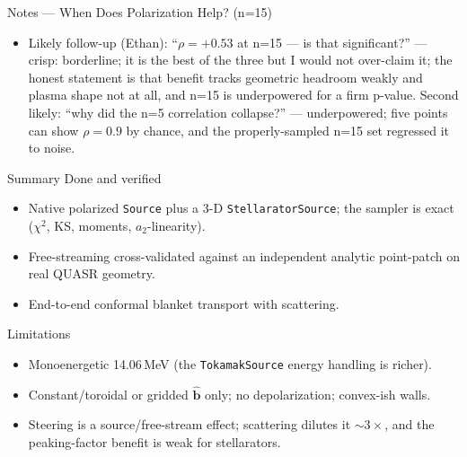 \documentclass[11pt,aspectratio=169]{beamer}
\newcommand{\bhat}{\hat{\mathbf{b}}}
\begin{document}
\begin{frame}[allowframebreaks]{Notes --- When Does Polarization Help? (n=15)}
{\begin{itemize}
      supported by the n=15 null but not independently proven --- the low-pass-filter argument
      ($T(N)\sim e^{-Na/R_0}$) is directly validated only for the \emph{ripple}, and \texttt{shaping\_amp}
      did not cleanly decouple. State it as supported-not-proven (QA\_RESEARCH Q35).
\item Likely follow-up (Ethan): ``$\rho=+0.53$ at n=15 --- is that significant?'' --- crisp: borderline;
      it is the best of the three but I would not over-claim it; the honest statement is that benefit
      tracks geometric headroom weakly and plasma shape not at all, and n=15 is underpowered for a firm
      p-value. Second likely: ``why did the n=5 correlation collapse?'' --- underpowered; five points can
      show $\rho=0.9$ by chance, and the properly-sampled n=15 set regressed it to noise.
\end{itemize}
}
\end{frame}

\begin{frame}{Summary}
Done and verified
\begin{itemize}\footnotesize
\item Native polarized \texttt{Source} plus a 3-D \texttt{StellaratorSource}; the sampler is
      exact ($\chi^2$, KS, moments, $a_2$-linearity).
\item Free-streaming cross-validated against an independent analytic point-patch on real
      QUASR geometry.
\item End-to-end conformal blanket transport with scattering.
\end{itemize}
Limitations
\begin{itemize}\footnotesize
\item Monoenergetic 14.06\,MeV (the \texttt{TokamakSource} energy handling is richer).
\item Constant/toroidal or gridded $\bhat$ only; no depolarization; convex-ish walls.
\item Steering is a source/free-stream effect; scattering dilutes it $\sim3\times$, and the
      peaking-factor benefit is weak for stellarators.
\end{itemize}
\end{frame}
\end{document}
